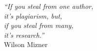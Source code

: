 \cleardoublepage
\thispagestyle{plain}

\vspace*{8cm}

\begin{flushright}
   \textsl{``If you steal from one author, 
   \\it’s plagiarism, but,
 \\
            if you steal from many, 
            \\
            it’s research.''} \\
\vspace*{1.5cm}
           Wilson Mizner
\end{flushright}
